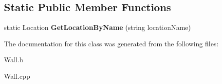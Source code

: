 \subsection*{Static Public Member Functions}
\begin{DoxyCompactItemize}
\item 
\hypertarget{class_wall_a1eb94a21287c2298197949567dbbfe74}{}static Location {\bfseries Get\+Location\+By\+Name} (string location\+Name)\label{class_wall_a1eb94a21287c2298197949567dbbfe74}

\end{DoxyCompactItemize}


The documentation for this class was generated from the following files\+:\begin{DoxyCompactItemize}
\item 
Wall.\+h\item 
Wall.\+cpp\end{DoxyCompactItemize}

